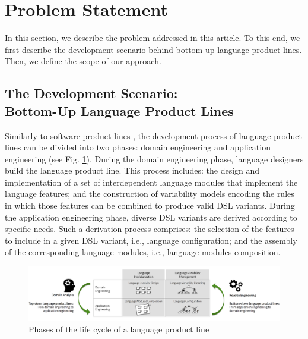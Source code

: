 \section{Problem Statement}
\label{sec:problemstatement}

In this section, we describe the problem addressed in this article. To this end, we first describe the development scenario behind bottom-up language product lines. Then, we define the scope of our approach. %

\subsection{The Development Scenario: \\ \textbf{Bottom-Up Language Product Lines}}
\label{sec:thedevelopmentscenario}

Similarly to software product lines \cite{Linden:2007}, the development process of language product lines can be divided into two phases: domain engineering and application engineering (see Fig. \ref{fig:lple-dimensions}). During the domain engineering phase, language designers build the language product line. This process includes: the design and implementation of a set of interdependent language modules that implement the language features; and the construction of variability models encoding the rules in which those features can be combined to produce valid DSL variants. During the application engineering phase, diverse DSL variants are derived according to specific needs. Such a derivation process comprises: the selection of the features to include in a given DSL variant, i.e., language configuration; and the assembly of the corresponding language modules, i.e., language modules composition. 

\begin{figure}
\centering
\includegraphics[width=1\linewidth]{images/lple-dimensions-fig.png}
\caption{Phases of the life cycle of a language product line \label{fig:lple-dimensions}}
\end{figure}

